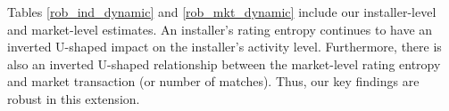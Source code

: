 \documentclass[msom,blindrev]{informs3}
\begin{document}
	Tables \ref{rob_ind_dynamic} and \ref{rob_mkt_dynamic} include our installer-level and market-level estimates. An installer's rating entropy continues to have an inverted U-shaped impact on the installer's activity level. Furthermore, there is also an inverted U-shaped relationship between the market-level rating entropy and market transaction (or number of matches).  Thus, our key findings are robust in this extension.
	
	
	
	
\end{document}
